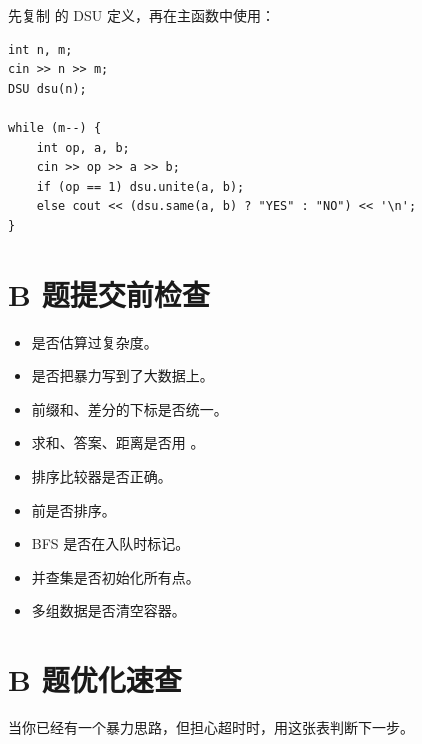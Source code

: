 先复制  的 DSU 定义，再在主函数中使用：

\begin{lstlisting}
int n, m;
cin >> n >> m;
DSU dsu(n);

while (m--) {
    int op, a, b;
    cin >> op >> a >> b;
    if (op == 1) dsu.unite(a, b);
    else cout << (dsu.same(a, b) ? "YES" : "NO") << '\n';
}
\end{lstlisting}

\section{B 题提交前检查}\label{sec:06-27}

\begin{itemize}
  \item 是否估算过复杂度。
  \item 是否把暴力写到了大数据上。
  \item 前缀和、差分的下标是否统一。
  \item 求和、答案、距离是否用 。
  \item 排序比较器是否正确。
  \item {} 前是否排序。
  \item BFS 是否在入队时标记。
  \item 并查集是否初始化所有点。
  \item 多组数据是否清空容器。
\end{itemize}

\section{B 题优化速查}\label{sec:06-28}

当你已经有一个暴力思路，但担心超时时，用这张表判断下一步。

